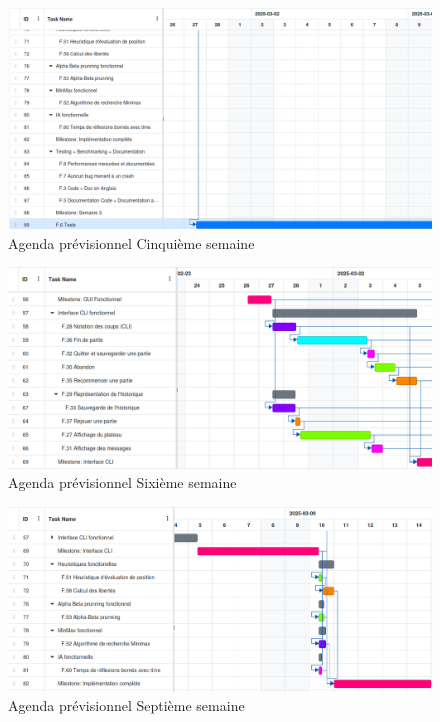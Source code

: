 \documentclass[a4paper,12pt]{article}
\begin{document}
\begin{figure}[H]
  \centering
  \includegraphics[width=18cm]{images/Semaine5.png}
  \caption{Agenda prévisionnel Cinquième semaine}
\end{figure}

\begin{figure}[H]
  \centering
  \includegraphics[width=18cm]{images/Semaine6.png}
  \caption{Agenda prévisionnel Sixième semaine}
\end{figure}

\begin{figure}[H]
  \centering
  \includegraphics[width=18cm]{images/Semaine7.png}
  \caption{Agenda prévisionnel Septième semaine}
\end{figure}
\end{document}
